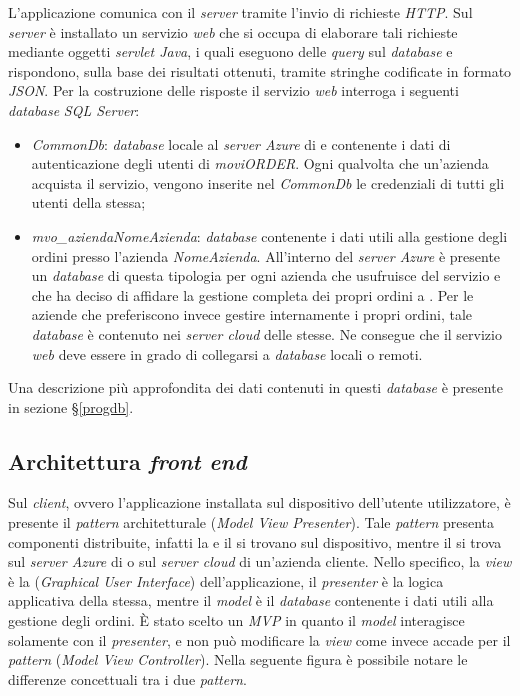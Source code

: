 L'applicazione comunica con il \textit{server} tramite l'invio di richieste \textit{HTTP}. Sul \textit{server} è installato un servizio \textit{web} che si occupa di elaborare tali richieste mediante oggetti \textit{servlet Java}, i quali eseguono delle \textit{query} sul \textit{database} e rispondono, sulla base dei risultati ottenuti, tramite stringhe codificate in formato \textit{JSON}. Per la costruzione delle risposte il servizio \textit{web} interroga i seguenti \textit{database} \textit{SQL Server}:
\begin{itemize}
	\item \textit{CommonDb}: \textit{database} locale al \textit{server Azure} di \visione{} e contenente i dati di autenticazione degli utenti di \textit{moviORDER}. Ogni qualvolta che un'azienda acquista il servizio, vengono inserite nel \textit{CommonDb} le credenziali di tutti gli utenti della stessa;
	\item \textit{mvo\_aziendaNomeAzienda}: \textit{database} contenente i dati utili alla gestione degli ordini presso l'azienda \textit{NomeAzienda}. All'interno del \textit{server Azure} è presente un \textit{database} di questa tipologia per ogni azienda che usufruisce del servizio e che ha deciso di affidare la gestione completa dei propri ordini a \visione{}. Per le aziende che preferiscono invece gestire internamente i propri ordini, tale \textit{database} è contenuto nei \textit{server cloud} delle stesse. Ne consegue che il servizio \textit{web} deve essere in grado di collegarsi a \textit{database} locali o remoti.
\end{itemize}
Una descrizione più approfondita dei dati contenuti in questi \textit{database} è presente in sezione §\ref{progdb}.

\subsection{Architettura \textit{front end}}

Sul \textit{client}, ovvero l'applicazione installata sul dispositivo dell'utente utilizzatore, è presente il \textit{pattern} architetturale  (\textit{Model View Presenter}). Tale \textit{pattern} presenta componenti distribuite, infatti la  e il  si trovano sul dispositivo, mentre il  si trova sul \textit{server Azure} di \visione{} o sul \textit{server cloud} di un'azienda cliente. Nello specifico, la \textit{view} è la  (\textit{Graphical User Interface}) dell'applicazione, il \textit{presenter} è la logica applicativa della stessa, mentre il \textit{model} è il \textit{database} contenente i dati utili alla gestione degli ordini. È stato scelto un \textit{MVP} in quanto il \textit{model} interagisce solamente con il \textit{presenter}, e non può modificare la \textit{view} come invece accade per il \textit{pattern}  (\textit{Model View Controller}). Nella seguente figura è possibile notare le differenze concettuali tra i due \textit{pattern}.

